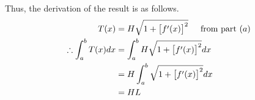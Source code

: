 \documentclass[a4paper]{article}
\begin{document}
\begin{enumerate}[label=\textbf{\arabic*.}]
\begin{enumerate}
		\bigbreak

		Thus, the derivation of the result is as follows.
		\begin{align*}
		T(x) & = H\sqrt{1 + \big[f^{\prime}(x)\big]^2} \hspace{5mm} \text{from part ${(a)}$}\\
		\therefore \int^{b}_{a}T(x)dx & = \int^{b}_{a}H\sqrt{1 + \big[f^{\prime}(x)\big]^2}dx\\
		& = H\int^{b}_{a}\sqrt{1 + \big[f^{\prime}(x)\big]^2}dx\\
		& = HL\\
		\end{align*}
		
	\end{enumerate}

\end{enumerate}
\end{document}
